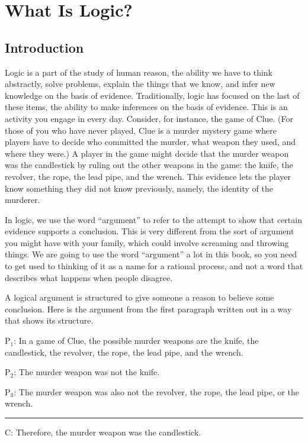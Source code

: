 \chapter{What Is Logic?}
\label{Chap:what_is_logic}


\section{Introduction}

Logic is a part of the study of human reason, the ability we have to think abstractly, solve problems, explain the things that we know, and infer new knowledge on the basis of evidence. Traditionally, logic has focused on the last of these items, the ability to make inferences on the basis of evidence. This is an activity you engage in every day. Consider, for instance, the game of Clue. (For those of you who have never played, Clue is a murder mystery game where players have to decide who committed the murder, what weapon they used, and where they were.) A player in the game might decide that the murder weapon was the candlestick by ruling out the other weapons in the game: the knife, the revolver, the rope, the lead pipe, and the wrench. This evidence lets the player know something they did not know previously, namely, the identity of the murderer.

 In logic, we use the word ``argument'' to refer to the attempt to show that certain evidence supports a conclusion. This is very different from the sort of argument you might have with your family, which could involve screaming and throwing things. We are going to use the word ``argument'' a lot in this book, so you need to get used to thinking of it as a name for a rational process, and not a word that describes what happens when people disagree.

A logical argument is structured to give someone a reason to believe some conclusion. Here is the argument from the first paragraph written out in a way that shows its structure. 


\label{argClue}
\begin{earg}
\item[P$_1$:] In a game of Clue, the possible murder weapons are the knife, the candlestick, the revolver, the rope, the lead pipe, and the wrench.
\item[P$_2$:] The murder weapon was not the knife.
\item[P$_3$:] The murder weapon was also not the revolver, the rope, the lead pipe, or the wrench.
\vspace{-.5em}
\item [] \rule{0.9\linewidth}{.5pt} 
\item[C:] Therefore, the murder weapon was the candlestick.
\end{earg} 

